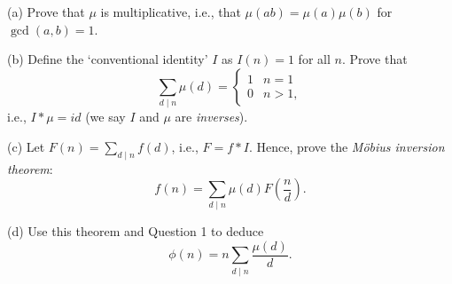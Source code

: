 \documentclass[10pt]{amsart}
\begin{document}
(a) Prove that $\mu$ is multiplicative, i.e., that $\mu(ab) = \mu(a)\mu(b)$ for $\gcd(a,b) = 1$.

\smallskip

(b) Define the `conventional identity' $I$ as $I(n) = 1$ for all $n$. Prove that
\[
\sum_{d \mid n} \mu(d) = \begin{cases} 1 & n = 1 \\ 0 & n > 1, \end{cases}
\]
i.e., $I * \mu = id$ (we say $I$ and $\mu$ are \emph{inverses}).

\smallskip

(c) Let $F(n) = \sum_{d \mid n} f(d)$, i.e., $F = f * I$. Hence, prove the \emph{M{\"o}bius inversion theorem}:
\[
f(n) = \sum_{d \mid n} \mu(d) F\left(\frac{n}{d}\right).
\]

\smallskip

(d) Use this theorem and Question 1 to deduce
\[
\phi(n) = n \sum_{d \mid n} \frac{\mu(d)}{d}.
\]
\end{document}
